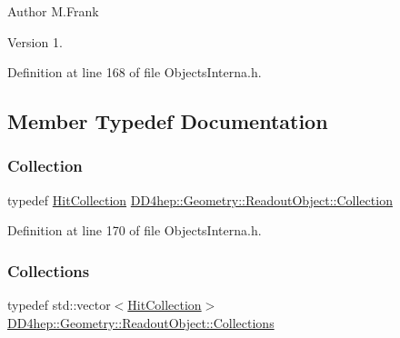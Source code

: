 \begin{DoxyAuthor}{Author}
M.\+Frank 
\end{DoxyAuthor}
\begin{DoxyVersion}{Version}
1. 
\end{DoxyVersion}


Definition at line 168 of file Objects\+Interna.\+h.



\subsection{Member Typedef Documentation}
\hypertarget{class_d_d4hep_1_1_geometry_1_1_readout_object_a3789c1e548f014ce44e2af9ff12f9757}{}\label{class_d_d4hep_1_1_geometry_1_1_readout_object_a3789c1e548f014ce44e2af9ff12f9757} 
\subsubsection{\texorpdfstring{Collection}{Collection}}
{\footnotesize\ttfamily typedef \hyperlink{class_d_d4hep_1_1_geometry_1_1_hit_collection}{Hit\+Collection} \hyperlink{class_d_d4hep_1_1_geometry_1_1_readout_object_a3789c1e548f014ce44e2af9ff12f9757}{D\+D4hep\+::\+Geometry\+::\+Readout\+Object\+::\+Collection}}



Definition at line 170 of file Objects\+Interna.\+h.

\hypertarget{class_d_d4hep_1_1_geometry_1_1_readout_object_a1093be792a71654cf6116686b0ab7cb6}{}\label{class_d_d4hep_1_1_geometry_1_1_readout_object_a1093be792a71654cf6116686b0ab7cb6} 
\subsubsection{\texorpdfstring{Collections}{Collections}}
{\footnotesize\ttfamily typedef std\+::vector$<$\hyperlink{class_d_d4hep_1_1_geometry_1_1_hit_collection}{Hit\+Collection}$>$ \hyperlink{class_d_d4hep_1_1_geometry_1_1_readout_object_a1093be792a71654cf6116686b0ab7cb6}{D\+D4hep\+::\+Geometry\+::\+Readout\+Object\+::\+Collections}}



